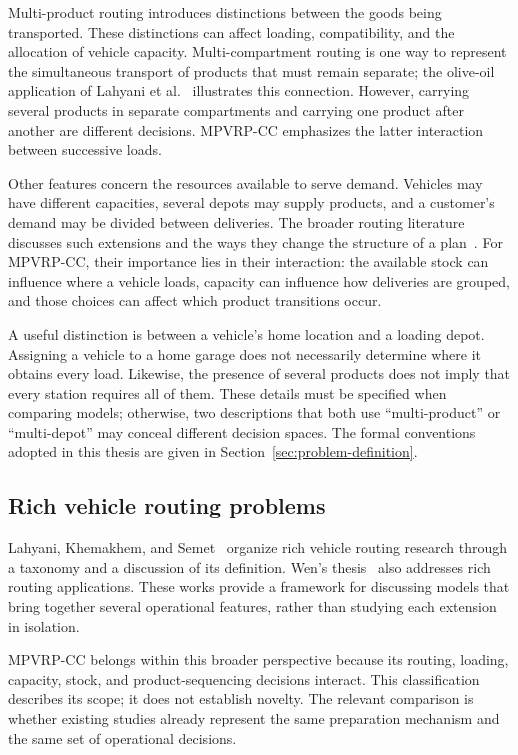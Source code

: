 Multi-product routing introduces distinctions between the goods being
transported. These distinctions can affect loading, compatibility, and the
allocation of vehicle capacity. Multi-compartment routing is one way to
represent the simultaneous transport of products that must remain separate;
the olive-oil application of Lahyani et
al.~\cite{lahyani2015oilmulticompartment} illustrates this connection.
However, carrying several products in separate compartments and carrying
one product after another are different decisions. MPVRP-CC emphasizes the
latter interaction between successive loads.

Other features concern the resources available to serve demand. Vehicles
may have different capacities, several depots may supply products, and a
customer's demand may be divided between deliveries. The broader routing
literature discusses such extensions and the ways they change the
structure of a plan~\cite{toth2014vehicle,wen2010rich}. For MPVRP-CC, their
importance lies in their interaction: the available stock can influence
where a vehicle loads, capacity can influence how deliveries are grouped,
and those choices can affect which product transitions occur.

A useful distinction is between a vehicle's home location and a loading
depot. Assigning a vehicle to a home garage does not necessarily determine
where it obtains every load. Likewise, the presence of several products does
not imply that every station requires all of them. These details must be
specified when comparing models; otherwise, two descriptions that both use
``multi-product'' or ``multi-depot'' may conceal different decision spaces.
The formal conventions adopted in this thesis are given in
Section~\ref{sec:problem-definition}.

\subsection{Rich vehicle routing problems}

Lahyani, Khemakhem, and Semet~\cite{lahyani2015taxonomy} organize rich vehicle
routing research through a taxonomy and a discussion of its definition.
Wen's thesis~\cite{wen2010rich} also addresses rich routing applications.
These works provide a framework for discussing models that bring together
several operational features, rather than studying each extension in
isolation.

MPVRP-CC belongs within this broader perspective because its routing,
loading, capacity, stock, and product-sequencing decisions interact. This
classification describes its scope; it does not establish novelty. The
relevant comparison is whether existing studies already represent the same
preparation mechanism and the same set of operational decisions.

